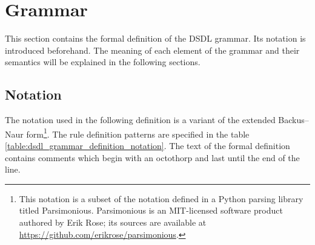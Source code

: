 \section{Grammar}\label{sec:dsdl_grammar}

This section contains the formal definition of the DSDL grammar.
Its notation is introduced beforehand.
The meaning of each element of the grammar and their semantics will be explained in the following sections.

\subsection{Notation}

The notation used in the following definition is a variant of the extended Backus--Naur
form\footnote{This notation is a subset of the notation defined in a Python parsing library titled Parsimonious.
Parsimonious is an MIT-licensed software product authored by Erik Rose;
its sources are available at \url{https://github.com/erikrose/parsimonious}.}.
The rule definition patterns are specified in the table \ref{table:dsdl_grammar_definition_notation}.
The text of the formal definition contains comments which begin with an octothorp and last until the end of the line.

